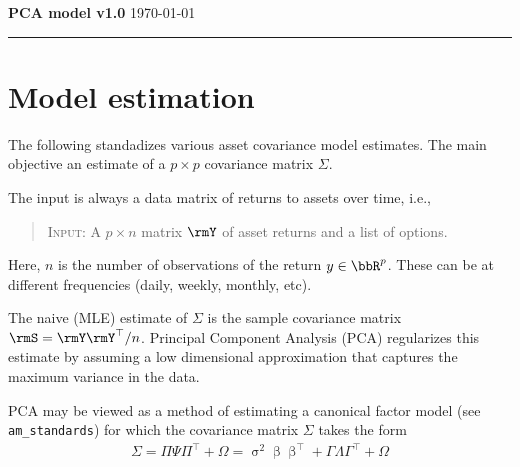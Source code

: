 \documentclass[leqno,12pt]{article}
\begin{document}
\ifxetex
  \let\lsum\sum
  \renewcommand{\sum}{\bm{\lsum}}

  \let\lprod\prod
  \renewcommand{\prod}{\bm{\lprod}}
\else
\fi


\newcommand{\covm}{\Sigma}
\newcommand{\tcov}{\Sigma}
\newcommand{\hcov}{\bm{\hat}{\Sigma}}

{
\noindent
{\bf PCA model v1.0}
\noindent
\hfill {\today} \noindent
\rule{\textwidth}{0.01in}


\section{Model estimation} The following 
standadizes various asset covariance model estimates. The main 
objective an estimate of a $p \times p$ covariance matrix $\tcov$.


\begin{mdframed}[style=clean]
The input is always a data matrix of returns to assets 
over time, i.e.,
\begin{quote}
 \textsc{Input}: A $p \times n$ matrix $\rmY$ of asset returns
and a list of options.
\end{quote}
Here, $n$ is the number of observations of the return
$y \in \bbR^p$. These can be at different frequencies
(daily, weekly, monthly, etc).
\end{mdframed}

The naive (MLE) estimate of $\tcov$ is the sample covariance 
matrix $\rmS = \rmY \rmY^\top /n$. Principal Component
Analysis (PCA) regularizes this estimate by assuming
a low dimensional approximation that captures the 
maximum variance in the data.


\newcommand{\bhat}{\bm{\hat}}

PCA may be viewed as a method of estimating a 
canonical factor model (see \verb|am_standards|)
for which the covariance matrix $\tcov$ takes the form 
\begin{align}
  \tcov 
  = \Pi \Psi \Pi^\top + \Omega
  = \upsigma^2 \upbeta \upbeta^\top + \Gamma \Lambda \Gamma^\top  
  + \Omega
\end{align}


\begin{mdframed}[style=wide]


\end{mdframed}}
\end{document}

